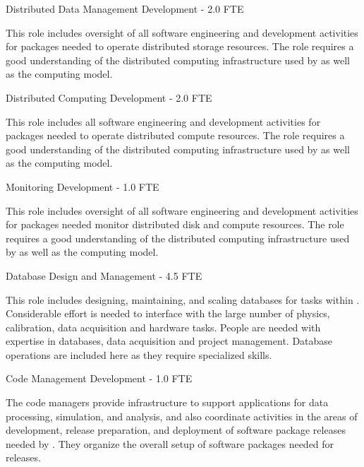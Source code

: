 \documentclass[../main-v1.tex]{subfiles}
\begin{document}
\begin{description}



\item {Distributed Data Management Development - 2.0 FTE}

This role includes oversight of all software engineering and development activities for packages needed to operate distributed storage resources. The role requires a good understanding of the distributed computing infrastructure used by  as well as the  computing model.

\item {Distributed Computing Development -  2.0 FTE}

This role includes all software engineering and development activities for packages needed to operate  distributed compute resources. The role requires a good understanding of the distributed computing infrastructure used by  as well as the  computing model.

\item {Monitoring Development -  1.0 FTE}

This role includes oversight of all software engineering and development activities for packages needed monitor distributed disk and compute resources. The role requires a good understanding of the distributed computing infrastructure used by  as well as the  computing model.

\item {Database Design and Management - 4.5 FTE}

This role includes designing, maintaining, and scaling databases for  
tasks within . Considerable effort is needed to interface with the large number of physics, calibration, data acquisition and hardware tasks. People are needed with expertise in databases, data acquisition and project management.  Database operations are included here as they require specialized skills. 

\item {Code Management Development - 1.0 FTE}

The code managers provide infrastructure to support applications for  data processing, simulation, and analysis, and also coordinate activities in the areas of development, release preparation, and %
deployment of software package releases needed by . They organize the overall setup of software packages needed for releases.


\end{description}
\end{document}
